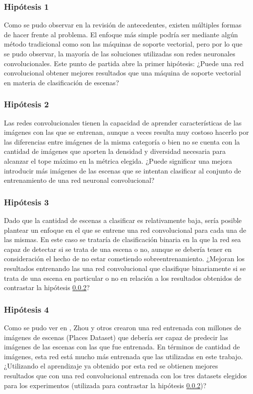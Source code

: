 \subsubsection{Hipótesis 1} \label{sssec:hipotesis1}
Como se pudo observar en la revisión de antecedentes, existen múltiples formas de hacer frente al problema. El enfoque más simple podría ser mediante algún método tradicional como son las máquinas de soporte vectorial, pero por lo que se pudo observar, la mayoría de las soluciones utilizadas son redes neuronales convolucionales. Este punto de partida abre la primer hipótesis: ¿Puede una red convolucional obtener mejores resultados que una máquina de soporte vectorial en materia de clasificación de escenas?

\subsubsection{Hipótesis 2} \label{sssec:hipotesis2}
Las redes convolucionales tienen la capacidad de aprender características de las imágenes con las que se entrenan, aunque a veces resulta muy costoso hacerlo por las diferencias entre imágenes de la misma categoría o bien no se cuenta con la cantidad de imágenes que aporten la densidad y diversidad necesaria para alcanzar el tope máximo en la métrica elegida. ¿Puede significar una mejora introducir más imágenes de las escenas que se intentan clasificar al conjunto de entrenamiento de una red neuronal convolucional?

\subsubsection{Hipótesis 3} \label{sssec:hipotesis3}
Dado que la cantidad de escenas a clasificar es relativamente baja, sería posible plantear un enfoque en el que se entrene una red convolucional para cada una de las mismas. En este caso se trataría de clasificación binaria en la que la red sea capaz de detectar si se trata de una escena o no, aunque se debería tener en consideración el hecho de no estar cometiendo sobreentrenamiento. ¿Mejoran los resultados entrenando las una red convolucional que clasifique binariamente si se trata de una escena en particular o no en relación a los resultados obtenidos de contrastar la hipótesis \ref{sssec:hipotesis2}?

\subsubsection{Hipótesis 4} \label{sssec:hipotesis4}
Como se pudo ver en \cite{learning_deep_features}, Zhou y otros crearon una red entrenada con millones de imágenes de escenas (Places Dataset) que debería ser capaz de predecir las imágenes de las escenas con las que fue entrenada. En términos de cantidad de imágenes, esta red está mucho más entrenada que las utilizadas en este trabajo. ¿Utilizando el aprendizaje ya obtenido por esta red se obtienen mejores resultados que con una red convolucional entrenada con los tres datasets elegidos para los experimentos (utilizada para contrastar la hipótesis \ref{sssec:hipotesis2})?

